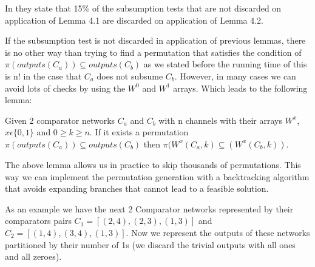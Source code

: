 \documentclass[../main.tex]{subfiles}
\begin{document}
	In \cite{sortingnineinputs} they state that 15\% of the subsumption tests that are not discarded on application of Lemma 4.1 are discarded on application of Lemma 4.2.
	
	If the subsumption test is not discarded in application of previous lemmas, there is no other way than trying to find a permutation that satisfies the condition of $\pi(outputs(C_a)) \subseteq outputs(C_b)$ as we stated before the running time of this is n! in the case that $C_a$ does not subsume $C_b$. However, in many cases we can avoid lots of checks by using the $W^0$ and $W^1$ arrays. Which leads to the following lemma:
	
	\begin{lemma}
		Given 2 comparator networks $C_a$ and $C_b$ with n channels with their arrays $W^x$, $x \epsilon \{0,1\}$ and $0\geq k \geq n$. If it exists a permutation $\pi(outputs(C_a)) \subseteq outputs(C_b)$ then $\pi(W^x(C_a, k) \subseteq (W^x(C_b, k))$.
	\end{lemma}
	
	
	The above lemma allows us in practice to skip thousands of permutations. This way we can implement the permutation generation with a backtracking algorithm that avoids expanding branches that cannot lead to a feasible solution.
	
	As an example we have the next 2 Comparator networks represented by their comparators pairs $C_1 = [(2,4), (2,3), (1,3)]$ and $C_2=[(1,4), (3,4), (1,3)]$. Now we represent the outputs of these networks partitioned by their number of 1s (we discard the trivial outputs with all ones and all zeroes).
	
\end{document}
